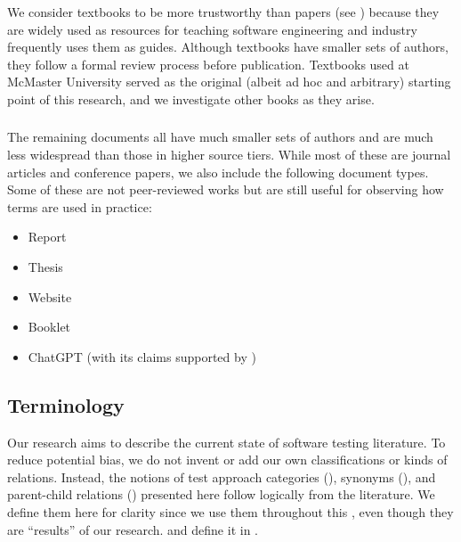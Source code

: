 We consider textbooks to be more trustworthy than papers (see )
because they are widely used as resources for teaching software engineering and
industry frequently uses them as guides. Although textbooks have smaller sets of
authors, they follow a formal review process before publication. Textbooks used
at McMaster University \citep{Patton2006,PetersAndPedrycz2000,vanVliet2000}
served as the original (albeit ad hoc and arbitrary) starting point of this
research, and we investigate other books as they arise. \addTextEx{}

\subsubsection{}
\label{papers}

The remaining documents all have much smaller sets of authors and are much less
widespread than those in higher source tiers. While most of these are journal
articles and conference papers, we also include the following document types.
Some of these are not peer-reviewed works but are still useful for
observing how terms are used in practice:

\begin{itemize}
    \item Report \citep{Kam2008,Gerrard2000a,Gerrard2000b}
    \item Thesis \citep{Bas2024}
    \item Website \citep{LambdaTest2024,Pandey2023}
    \item Booklet \citep{SPICE2022}
    \item \ifnotpaper \else ChatGPT \fi \citet{ChatGPT2024} (with its claims
          supported by \citet{RusEtAl2008})
\end{itemize}

\ifnotpaper\else
    \begin{table*}[t!]
        \ieeeCatsTable{}
    \end{table*}
\fi

\subsection{Terminology}
\label{terminology}

Our research aims to describe the current state of software testing
literature. To reduce potential bias, we do not invent or add our own
classifications or kinds of relations. Instead, the notions of test approach
categories (), synonyms (), and
parent-child relations () presented here
follow logically from the literature. We define them here for clarity
since we use them throughout this \docType{}, even though they are
``results'' of our research. \rigidBlurb{} and define it in .


